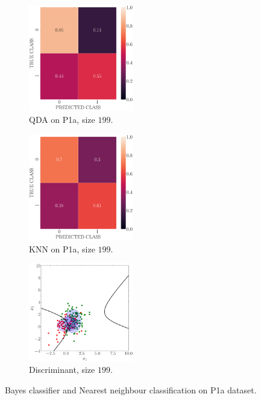 \documentclass[11pt, a4 paper]{article}
\begin{document}
\begin{figure}[!htbp]
\quad    
    \begin{subfigure}[!htbp]{0.24\textwidth}
       \centering
       \includegraphics[width=1.8in]{../results/ex1/conf_mtx_QD_ML_dataset_P1a_size_199.pdf}
       \caption{QDA on P1a, size $199$.}
       \label{fig:QDA_P1a_199}
    \end{subfigure}
\quad    
    \begin{subfigure}[!htbp]{0.24\textwidth}
       \centering
       \includegraphics[width=1.8in]{../results/ex1/conf_mtx_KNN_dataset_P1a_size_199.pdf}
       \caption{KNN on P1a, size $199$.}
       \label{fig:KNN_P1a_199}
    \end{subfigure}
\quad
    \begin{subfigure}[!htbp]{0.24\textwidth}
       \centering
       \includegraphics[width=1.8in]{../results/ex1/samples_QD_ML_dataset_P1a_size_199.pdf}
       \caption{Discriminant, size $199$.}
       \label{fig:DF_P1a_199}
    \end{subfigure}

\caption{Bayes classifier and Nearest neighbour classification on P1a dataset.}
\label{fig:ex11P1a}
\end{figure}
\end{document}
